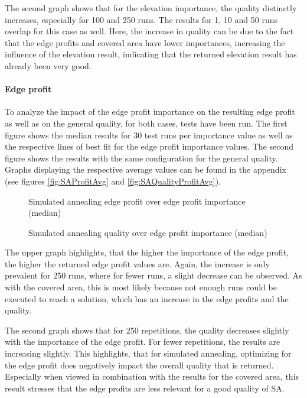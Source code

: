 The second graph shows that for the elevation importance, the quality distinctly increases, especially for 100 and 250 runs. 
The results for 1, 10 and 50 runs overlap for this case as well.
Here, the increase in quality can be due to the fact that the edge profits and covered area have lower importances, increasing the influence of the elevation result, indicating that the returned elevation result has already been very good.



\paragraph{Edge profit}


To analyze the impact of the edge profit importance on the resulting edge profit as well as on the general quality, for both cases, tests have been run.
The first figure shows the median results for 30 test runs per importance value as well as the respective lines of best fit for the edge profit importance values.
The second figure shows the results with the same configuration for the general quality.
Graphs displaying the respective average values can be found in the appendix (see figures \ref{fig:SAProfitAvg} and \ref{fig:SAQualityProfitAvg}).


\begin{figure}[H]
	\centering
	
	\caption{Simulated annealing edge profit over edge profit importance (median)}
	\label{fig:SAProfitMed}
\end{figure}


\begin{figure}[H]
	\centering
	
	\caption{Simulated annealing quality over edge profit importance (median)}
	\label{fig:SAQualityProfitMed}
\end{figure}




The upper graph highlights, that the higher the importance of the edge profit, the higher the returned edge profit values are. 
Again, the increase is only prevalent for 250 runs, where for fewer runs, a slight decrease can be observed. 
As with the covered area, this is most likely because not enough runs could be executed to reach a solution, which has an increase in the edge profits and the quality.


The second graph shows that for 250 repetitions, the quality decreases slightly with the importance of the edge profit.
For fewer repetitions, the results are increasing slightly.
This highlights, that for simulated annealing, optimizing for the edge profit does negatively impact the overall quality that is returned. 
Especially when viewed in combination with the results for the covered area, this result stresses that the edge profits are less relevant for a good quality of SA.


